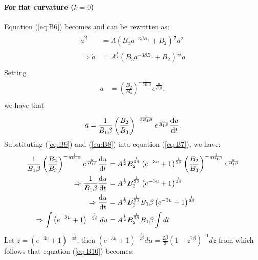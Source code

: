 \documentclass[a4paper, 11pt]{FSKH_623_Report}
\numberwithin{equation}{section}
\newcommand{\brac}[1]{\left(#1\right)}
\begin{document}
\paragraph{For flat curvature ($k=0$)}
Equation (\ref{eq:B6}) becomes and can be rewritten as:
\begin{equation}\label{eq:B7}
\begin{split}
\dot{a}^{2} &= A\brac{B_{3}a^{-3\beta B_{1}}+B_{2}}^{\frac{1}{\beta}} a^{2}\\
\Rightarrow \dot{a} &= A^{\frac{1}{2}}\brac{B_{3}a^{-3\beta B_{1}}+B_{2}}^{\frac{1}{2\beta}} a\\
\end{split}
\end{equation}
Setting 
\begin{equation}\label{eq:B8}
\begin{split}
a&=\brac{\frac{B_{2}}{B_{3}}}^{-\frac{1}{3B_{1}\beta}}e^{\frac{u}{B_{1}\beta}},\\
\end{split}
\end{equation}
we have that 
\begin{equation}\label{eq:B9}
\begin{split}
\dot{a}&=\frac{1}{B_{1}\beta}\brac{\frac{B_{2}}{B_{3}}}^{-\frac{1}{3B_{1}\beta}}e^{\frac{u}{B_{1}\beta}}\dv{u}{t}.\\
\end{split}
\end{equation}
Substituting (\ref{eq:B9}) and (\ref{eq:B8}) into equation (\ref{eq:B7}), we have:
\begin{equation}\label{eq:B10}
\begin{split}
\frac{1}{B_{1}\beta}\brac{\frac{B_{2}}{B_{3}}}^{-\frac{1}{3B_{1}\beta}}e^{\frac{u}{B_{1}\beta}}\dv{u}{t} &= A^{\frac{1}{2}}B_{2}^{\frac{1}{2\beta}}\brac{e^{-3u}+1}^{\frac{1}{2\beta}} \brac{\frac{B_{2}}{B_{3}}}^{-\frac{1}{3B_{1}\beta}}e^{\frac{u}{B_{1}\beta}}\\
\Rightarrow \frac{1}{B_{1}\beta}\dv{u}{t} &= A^{\frac{1}{2}}B_{2}^{\frac{1}{2\beta}}\brac{e^{-3u}+1}^{\frac{1}{2\beta}} \\
\Rightarrow \dv{u}{t} &= A^{\frac{1}{2}}B_{2}^{\frac{1}{2\beta}}B_{1}\beta\brac{e^{-3u}+1}^{\frac{1}{2\beta}} \\
\Rightarrow\int \brac{e^{-3u}+1}^{-\frac{1}{2\beta}} du&= A^{\frac{1}{2}}B_{2}^{\frac{1}{2\beta}}B_{1}\beta \int dt \\
\end{split}
\end{equation}
Let $z=\brac{e^{-3u}+1}^{-\frac{1}{2\beta}}$, then $\brac{e^{-3u}+1}^{-\frac{1}{2\beta}}du=\frac{2\beta}{3}\brac{1-z^{2\beta}}^{-1}dz$ from which follows that equation (\ref{eq:B10}) becomes:
\end{document}
